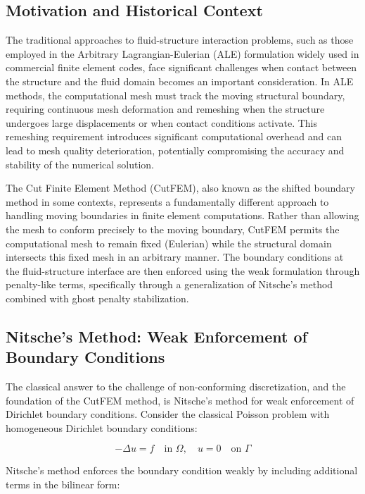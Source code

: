 ﻿\documentclass[a4paper,11pt]{article}
\theoremstyle{definition}
\begin{document}
\subsection{Motivation and Historical Context}

The traditional approaches to fluid-structure interaction problems, such as those employed in the Arbitrary Lagrangian-Eulerian (ALE) formulation widely used in commercial finite element codes, face significant challenges when contact between the structure and the fluid domain becomes an important consideration. In ALE methods, the computational mesh must track the moving structural boundary, requiring continuous mesh deformation and remeshing when the structure undergoes large displacements or when contact conditions activate. This remeshing requirement introduces significant computational overhead and can lead to mesh quality deterioration, potentially compromising the accuracy and stability of the numerical solution.

The Cut Finite Element Method (CutFEM), also known as the shifted boundary method in some contexts, represents a fundamentally different approach to handling moving boundaries in finite element computations. Rather than allowing the mesh to conform precisely to the moving boundary, CutFEM permits the computational mesh to remain fixed (Eulerian) while the structural domain intersects this fixed mesh in an arbitrary manner. The boundary conditions at the fluid-structure interface are then enforced using the weak formulation through penalty-like terms, specifically through a generalization of Nitsche's method combined with ghost penalty stabilization.

\subsection{Nitsche's Method: Weak Enforcement of Boundary Conditions}

The classical answer to the challenge of non-conforming discretization, and the foundation of the CutFEM method, is Nitsche's method for weak enforcement of Dirichlet boundary conditions. Consider the classical Poisson problem with homogeneous Dirichlet boundary conditions:

\begin{equation}
-\Delta u = f \quad \text{in } \Omega, \quad u = 0 \quad \text{on } \Gamma
\end{equation}

Nitsche's method enforces the boundary condition weakly by including additional terms in the bilinear form:
\end{document}
